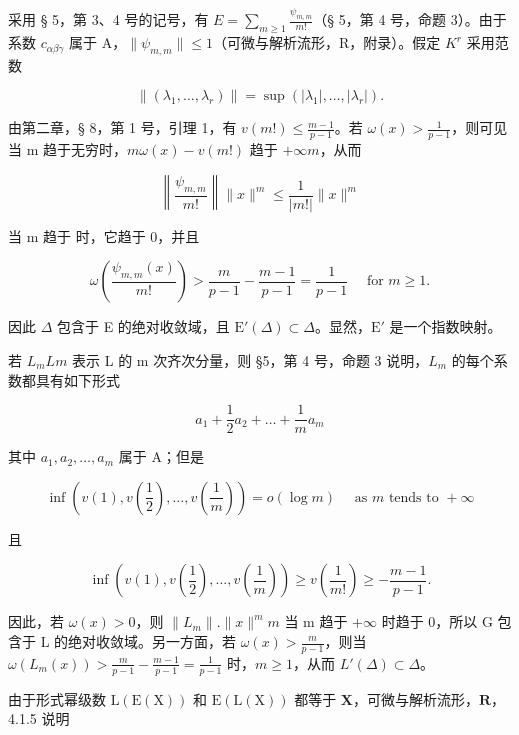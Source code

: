 采用 § 5，第 3、4 号的记号，有 \(E = \sum_{m \geqslant 1} \frac{\psi_{m,m}}{m!}\)（§ 5，第 4 号，命题 3）。由于系数 \(c_{\alpha\beta\gamma}\) 属于 A，\(\|\psi_{m,m}\| \leqslant 1\)（可微与解析流形，R，附录）。假定 \(K^{r}\) 采用范数

\[
\left\| \left(\lambda_ {1}, \dots , \lambda_ {r}\right) \right\| = \sup \left(\left| \lambda_ {1} \right|, \dots , \left| \lambda_ {r} \right|\right).
\]

由第二章，§ 8，第 1 号，引理 1，有 \(v(m!) \leqslant \frac{m - 1}{p - 1}\)。若 \(\omega(x) > \frac{1}{p - 1}\)，则可见当 m 趋于无穷时，\(m\omega(x) - v(m!)\) 趋于 \(+\infty\)\(m\)，从而

\[
\left\| \frac {\psi_ {m , m}}{m !} \right\| \| x \| ^ {m} \leqslant \frac {1}{| m ! |} \| x \| ^ {m}
\]

当 m 趋于  时，它趋于 0，并且

\[
\omega \left(\frac {\psi_ {m , m} (x)}{m !}\right) > \frac {m}{p - 1} - \frac {m - 1}{p - 1} = \frac {1}{p - 1} \quad \text { for } m \geqslant 1.
\]

因此 \(\Delta\) 包含于 E 的绝对收敛域，且 \(\mathrm{E}'(\Delta) \subset \Delta\)。显然，\(\mathrm{E}'\) 是一个指数映射。

若 \(L_{m}\)\(L\)\(m\) 表示 L 的 m 次齐次分量，则 §5，第 4 号，命题 3 说明，\(L_{m}\) 的每个系数都具有如下形式

\[
a _ {1} + \frac {1}{2} a _ {2} + \dots + \frac {1}{m} a _ {m}
\]

其中 \(a_1, a_2, \ldots, a_m\) 属于 A；但是

\[
\inf \left(v (1), v \left(\frac {1}{2}\right), \dots , v \left(\frac {1}{m}\right)\right) = o (\log m) \quad \text { as   } m \text {   tends   to   } + \infty
\]

且

\[
\inf \left(v (1), v \left(\frac {1}{2}\right), \dots , v \left(\frac {1}{m}\right)\right) \geqslant v \left(\frac {1}{m !}\right) \geqslant - \frac {m - 1}{p - 1}.
\]

因此，若 \(\omega(x) > 0\)，则 \(\|L_m\|. \|x\|^m\)\(m\) 当 m 趋于  \(+\infty\) 时趋于 0，所以 G 包含于 L 的绝对收敛域。另一方面，若 \(\omega(x) > \frac{m}{p-1}\)，则当 \(\omega(L_m(x)) > \frac{m}{p-1} - \frac{m-1}{p-1} = \frac{1}{p-1}\) 时，\(m \geqslant 1\)，从而 \(L'(\Delta) \subset \Delta\)。

由于形式幂级数 \(\mathrm{L}(\mathrm{E}(\mathrm{X}))\) 和 \(\mathrm{E}(\mathrm{L}(\mathrm{X}))\) 都等于 \(\mathbf{X}\)，可微与解析流形，\(\mathbf{R}\)，4.1.5 说明

